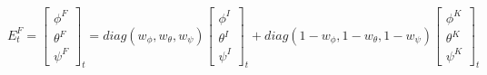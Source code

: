 \begin{equation} E^F_t = 
	\begin{bmatrix}  \phi^F \\  \theta^F \\  \psi^F \end{bmatrix}_t = 
	diag(w_\phi,w_\theta,w_\psi)
	\begin{bmatrix}  \phi^I \\  \theta^I \\  \psi^I \end{bmatrix}_t + 
	diag(1-w_\phi,1-w_\theta,1-w_\psi)
	\begin{bmatrix}  \phi^K \\  \theta^K \\  \psi^K \end{bmatrix}_t
	\label{eq:hybrid:reliableFusion}
\end{equation}
										
